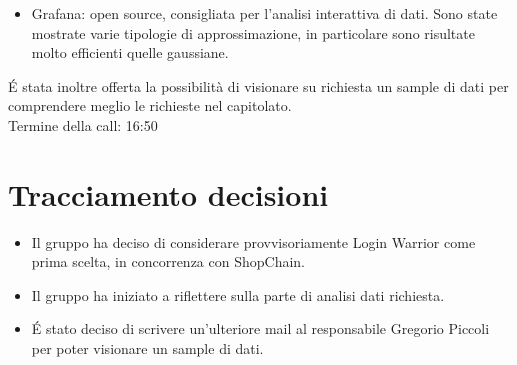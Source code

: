 \begin{itemize}
		\item Grafana: open source, consigliata per l'analisi interattiva di dati. Sono state mostrate varie tipologie di approssimazione, in particolare sono risultate molto efficienti quelle gaussiane.
\end{itemize}

\noindent 
\'E stata inoltre offerta la possibilità di visionare su richiesta un sample di dati per comprendere meglio le richieste nel capitolato. \\

\noindent
Termine della call: 16:50

\section{Tracciamento decisioni}

\begin{itemize}
	\item Il gruppo ha deciso di considerare provvisoriamente Login Warrior come prima scelta, in concorrenza con ShopChain.
	\item Il gruppo ha iniziato a riflettere sulla parte di analisi dati richiesta.
	\item \'E stato deciso di scrivere un'ulteriore mail al responsabile Gregorio Piccoli per poter visionare un sample di dati.
\end{itemize}